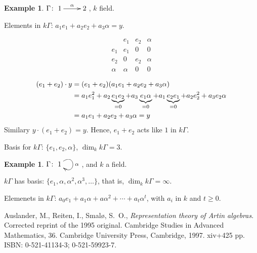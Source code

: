 \documentclass{amsart}
\numberwithin{equation}{section}
\theoremstyle{definition}
\newtheorem{exam}[thm]{Example}
\begin{document}
\begin{exam}
$\Gamma\colon \xymatrix{1\ar[r]^\alpha & 2}$, $k$ field.  

Elements in $k\Gamma$:  $a_1e_1 + a_2e_2 + a_3\alpha = y$. 

\[\begin{array}{c||c|c|c}
      & e_1 & e_2 & \alpha \\ \hline\hline 
e_1 & e_1 &  0   &    0   \\ \hline
e_2 &   0   & e_2 &  \alpha \\ \hline
\alpha & \alpha & 0 & 0
\end{array}\]
\end{exam}
\begin{align}
(e_1 + e_2)\cdot y & = (e_1 + e_2)(a_1e_1 + a_2e_2 +
                     a_3\alpha)\notag\\
& = a_1e_1^2 + a_2\underbrace{e_1e_2}_{=0} + a_3\underbrace{e_1\alpha}_{=0} + a_1\underbrace{e_2e_1}_{=0} + a_2e_2^2 + a_3
  e_2\alpha\notag\\
& = a_1e_1 + a_2e_2 + a_3\alpha = y\notag
\end{align} 
Similary $y\cdot (e_1 + e_2) = y$.  Hence,  $e_1 + e_2$ acts like $1$
in $k\Gamma$. 

Basis for $k\Gamma$: $\{ e_1, e_2, \alpha\}$, $\dim_kk\Gamma = 3$.

\begin{exam}
$\Gamma\colon \xymatrix{1\ar@(ur,dr)[]^\alpha}$, and $k$ a field.

$k\Gamma$ has basis: $\{e_1, \alpha, \alpha^2, \alpha^3, \ldots\}$,
that is, $\dim_k k\Gamma = \infty$. 

Elemenets in $k\Gamma$: $a_0e_1 + a_1\alpha + a\alpha^2 + \cdots +
a_t\alpha^t$, with $a_i$ in $k$ and $t\geqslant 0$.  
\end{exam}

\printindex
\begin{thebibliography}{ARS}
 Auslander, M., Reiten, I., Smal\o, S.\ O.,
  \emph{Representation theory of Artin algebras}. Corrected reprint of
  the 1995 original. Cambridge Studies in Advanced Mathematics,
  36. Cambridge University Press, Cambridge, 1997. xiv+425 pp. ISBN:
  0-521-41134-3; 0-521-59923-7.
\end{thebibliography}
\end{document}
